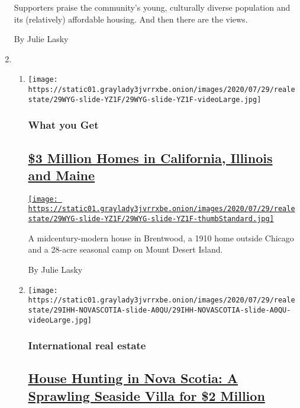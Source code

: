 \begin{enumerate}
  Supporters praise the community's young, culturally diverse population
  and its (relatively) affordable housing. And then there are the views.

  By Julie Lasky
\item
  \begin{enumerate}
  \def\labelenumii{\arabic{enumii}.}
  \item
    \texttt{[image: https://static01.graylady3jvrrxbe.onion/images/2020/07/29/realestate/29WYG-slide-YZ1F/29WYG-slide-YZ1F-videoLarge.jpg]}

    \hypertarget{what-you-get}{%
    \subsubsection{What you Get}\label{what-you-get}}

    \hypertarget{3-million-homes-in-california-illinois-and-maine}{%
    \subsection{\texorpdfstring{\href{/2020/07/29/realestate/3-million-homes-in-california-illinois-and-maine.html}{\$3
    Million Homes in California, Illinois and
    Maine}}{\$3 Million Homes in California, Illinois and Maine}}\label{3-million-homes-in-california-illinois-and-maine}}

    \href{/2020/07/29/realestate/3-million-homes-in-california-illinois-and-maine.html}{\texttt{[image: https://static01.graylady3jvrrxbe.onion/images/2020/07/29/realestate/29WYG-slide-YZ1F/29WYG-slide-YZ1F-thumbStandard.jpg]}}

    A midcentury-modern house in Brentwood, a 1910 home outside Chicago
    and a 28-acre seasonal camp on Mount Desert Island.

    By Julie Lasky
  \item
    \texttt{[image: https://static01.graylady3jvrrxbe.onion/images/2020/07/29/realestate/29IHH-NOVASCOTIA-slide-A0QU/29IHH-NOVASCOTIA-slide-A0QU-videoLarge.jpg]}

    \hypertarget{international-real-estate}{%
    \subsubsection{International real
    estate}\label{international-real-estate}}

    \hypertarget{house-hunting-in-nova-scotia-a-sprawling-seaside-villa-for-2-million}{%
    \subsection{\texorpdfstring{\href{/2020/07/29/realestate/house-hunting-in-nova-scotia-a-sprawling-seaside-villa-for-2-million.html}{House
    Hunting in Nova Scotia: A Sprawling Seaside Villa for \$2
    Million}}{House Hunting in Nova Scotia: A Sprawling Seaside Villa for \$2 Million}}\label{house-hunting-in-nova-scotia-a-sprawling-seaside-villa-for-2-million}}


\end{enumerate}
\end{enumerate}
